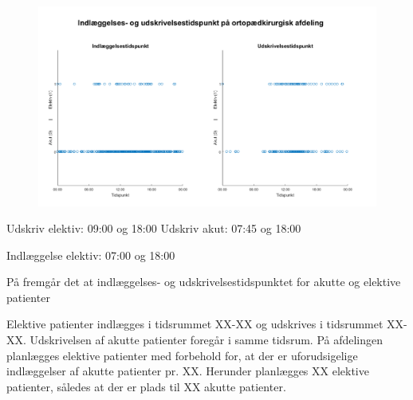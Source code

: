 \begin{figure}[H]
	\flushleft 
	\centering
	\includegraphics[scale=0.8]{figures/indlaegudskriv.png}
	\flushleft
	\caption{\textit{}}
	\label{indlaegudskriv}
	\end{figure}
	
	
Udskriv elektiv: 09:00 og 18:00
Udskriv akut: 07:45 og 18:00

Indlæggelse elektiv: 07:00 og 18:00

	
\noindent
På  fremgår det at indlæggelses- og udskrivelsestidspunktet for akutte og elektive patienter 

Elektive patienter indlægges i tidsrummet XX-XX og udskrives i tidsrummet XX-XX. Udskrivelsen af akutte patienter foregår i samme tidsrum. På afdelingen planlægges elektive patienter med forbehold for, at der er uforudsigelige indlæggelser af akutte patienter pr. XX. Herunder planlægges XX elektive patienter, således at der er plads til XX akutte patienter.